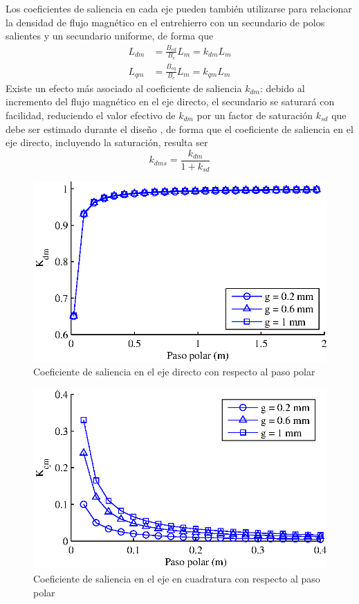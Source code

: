 Los coeficientes de saliencia en cada eje pueden también utilizarse para relacionar la densidad de flujo magnético en el entrehierro con un secundario de polos salientes y un secundario uniforme, de forma que
\begin{align}
L_{dm} &= \frac{B_{ed}}{B_e}L_m = k_{dm}L_m \\
L_{qm} &= \frac{B_{eq}}{B_e}L_m = k_{qm}L_m
\end{align}
Existe un efecto más asociado al coeficiente de saliencia $k_{dm}$: debido al incremento del flujo magnético en el eje directo, el secundario se saturará con facilidad, reduciendo el valor efectivo de $k_{dm}$ por un factor de saturación $k_{sd}$ que debe ser estimado durante el diseño \cite{boldea2013}, de forma que el coeficiente de saliencia en el eje directo, incluyendo la saturación, resulta ser
\begin{equation}
k_{dms} = \frac{k_{dm}}{1+k_{sd}}
\end{equation}


\begin{figure}[ht]
\centering
\includegraphics[scale=0.7]{../img/Teoria_del_MLR/kdmvstau.eps}
\caption{Coeficiente de saliencia en el eje directo con respecto al paso polar}
\label{fig:kdmvstau}
\end{figure}

\begin{figure}[ht]
\centering
\includegraphics[scale=0.7]{../img/Teoria_del_MLR/kqmvstau.eps}
\caption{Coeficiente de saliencia en el eje en cuadratura con respecto al paso polar}
\label{fig:kqmvstau}
\end{figure}


